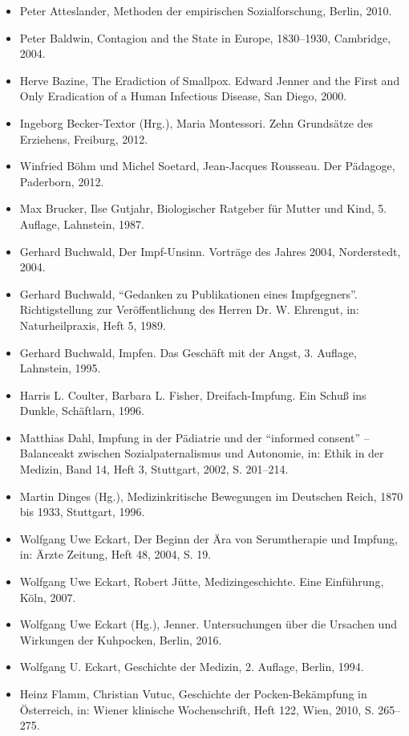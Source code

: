 \documentclass[
    a4paper,
    12pt,
    hyphens,
    chapterprefix=true,
    headheight=33pt,
    footheight=29pt,
    headings=optiontohead,
]{scrartcl}
\begin{document}
{\begin{itemize}
\item{Peter Atteslander, Methoden der empirischen Sozialforschung, Berlin, 2010.}
\item{Peter Baldwin, Contagion and the State in Europe, 1830--1930, Cambridge, 2004.}
\item{Herve Bazine, The Eradiction of Smallpox. Edward Jenner and the First and Only Eradication of a Human Infectious Disease, San Diego, 2000.}
\item{Ingeborg Becker-Textor (Hrg.), Maria Montessori. Zehn Grundsätze des Erziehens, Freiburg, 2012.}
\item{Winfried Böhm und Michel Soetard, Jean-Jacques Rousseau. Der Pädagoge, Paderborn, 2012.}
\item{Max Brucker, Ilse Gutjahr, Biologischer Ratgeber für Mutter und Kind, 5. Auflage, Lahnstein, 1987.}
\item{Gerhard Buchwald, Der Impf-Unsinn. Vorträge des Jahres 2004, Norderstedt, 2004.}
\item{Gerhard Buchwald, "`Gedanken zu Publikationen eines Impfgegners"'. Richtigstellung zur Veröffentlichung des Herren Dr. W. Ehrengut, in: Naturheilpraxis, Heft 5, 1989.}
\item{Gerhard Buchwald, Impfen. Das Geschäft mit der Angst, 3. Auflage, Lahnstein, 1995.}
\item{Harris L. Coulter, Barbara L. Fisher, Dreifach-Impfung. Ein Schuß ins Dunkle, Schäftlarn, 1996.}
\item{Matthias Dahl, Impfung in der Pädiatrie und der "`informed consent"' -- Balanceakt zwischen Sozialpaternalismus und Autonomie, in: Ethik in der Medizin, Band 14, Heft 3, Stuttgart, 2002, S. 201--214.}
\item{Martin Dinges (Hg.), Medizinkritische Bewegungen im Deutschen Reich, 1870 bis 1933, Stuttgart, 1996.}
\item{Wolfgang Uwe Eckart, Der Beginn der Ära von Serumtherapie und Impfung, in: Ärzte Zeitung, Heft 48, 2004, S. 19.}
\item{Wolfgang Uwe Eckart, Robert Jütte, Medizingeschichte. Eine Einführung, Köln, 2007.}
\item{Wolfgang Uwe Eckart (Hg.), Jenner. Untersuchungen über die Ursachen und Wirkungen der Kuhpocken, Berlin, 2016.}
\item{Wolfgang U. Eckart, Geschichte der Medizin, 2. Auflage, Berlin, 1994.}
\item{Heinz Flamm, Christian Vutuc, Geschichte der Pocken-Bekämpfung in Österreich, in: Wiener klinische Wochenschrift, Heft 122, Wien, 2010, S. 265--275.}

\end{itemize}}
\end{document}
